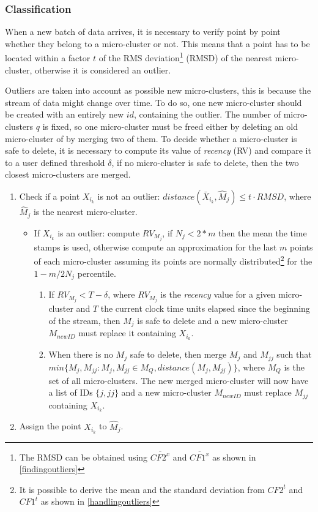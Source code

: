 \subsubsection{Classification}
\label{clus:classification}
When a new batch of data arrives, it is necessary to verify point by point whether they belong to a micro-cluster or not. This means that a point has to be located within a factor $t$ of the RMS deviation\footnote{The RMSD can be obtained using $\overline{CF2^x}$ and $\overline{CF1^x}$ as shown in \ref{findingoutliers}} (RMSD) of the nearest micro-cluster, otherwise it is considered an outlier.

Outliers are taken into account as possible new micro-clusters, this is because the stream of data might change over time. To do so, one new micro-cluster should be created with an entirely new $id$, containing the outlier. The number of micro-clusters $q$ is fixed, so one micro-cluster must be freed either by deleting an old micro-cluster of by merging two of them. To decide whether a micro-cluster is safe to delete, it is necessary to compute its value of \textit{recency} (RV) and compare it to a user defined threshold $\delta$, if no micro-cluster is safe to delete, then the two closest micro-clusters are merged.

\begin{enumerate}
 \item Check if a point $X_{i_k}$ is not an outlier: $distance(\bar X_{i_k}, \hat M_j) \leq t \cdot RMSD$, where $\hat M_j$ is the nearest micro-cluster.
 \begin{itemize}
  \item If $X_{i_k}$ is an outlier: compute $RV_{M_j}$, if $N_j < 2*m$ then the mean the time stamps is used, otherwise compute an approximation for the last $m$ points of each micro-cluster assuming its points are normally distributed\footnote{It is possible to derive the mean and the standard deviation from $CF2^t$ and $CF1^t$ as shown in \ref{handlingoutliers}} for the $1 - m/2N_j$ percentile.
  \begin{enumerate}
   \item If $RV_{M_j} < T - \delta$, where $RV_{M_j}$ is the \textit{recency} value for a given micro-cluster and $T$ the current clock time units elapsed since the beginning of the stream, then $M_j$ is safe to delete and a new micro-cluster $M_{newID}$ must replace it containing $X_{i_k}$.
   \item When there is no $M_j$ safe to delete, then merge $M_j$ and $M_{jj}$ such that $min\{M_j,M_{jj} : M_j,M_{jj} \in M_Q, distance(M_j,M_{jj})\}$, where $M_Q$ is the set of all micro-clusters. The new merged micro-cluster will now have a list of IDs $\{j,jj\}$ and a new micro-cluster $M_{newID}$ must replace $M_{jj}$ containing $X_{i_k}$.
  \end{enumerate}

 \end{itemize}
 \item Assign the point $X_{i_k}$ to $\hat M_j$.

\end{enumerate}


